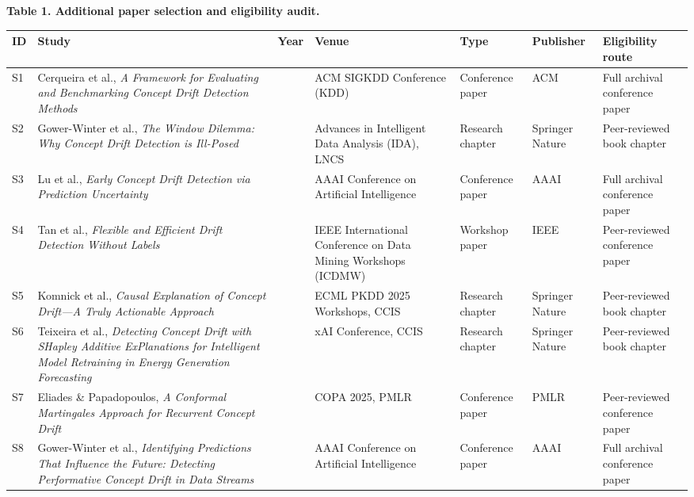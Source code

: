 \documentclass[
]{article}
\begin{document}
\textbf{Table 1. Additional paper selection and eligibility audit.}

\begin{longtable}[]{@{}
  >{\raggedright\arraybackslash}p{}
  >{\raggedright\arraybackslash}p{}
  >{\raggedright\arraybackslash}p{}
  >{\raggedright\arraybackslash}p{}
  >{\raggedright\arraybackslash}p{}
  >{\raggedright\arraybackslash}p{}
  >{\raggedright\arraybackslash}p{}@{}}
\toprule
ID & Study & Year & Venue & Type & Publisher & Eligibility route \\
\midrule
\endhead
S1 & Cerqueira et al., \emph{A Framework for Evaluating and Benchmarking
Concept Drift Detection Methods} & 2026 & ACM SIGKDD Conference (KDD) &
Conference paper & ACM & Full archival conference paper \\
S2 & Gower-Winter et al., \emph{The Window Dilemma: Why Concept Drift
Detection is Ill-Posed} & 2026 & Advances in Intelligent Data Analysis
(IDA), LNCS & Research chapter & Springer Nature & Peer-reviewed book
chapter \\
S3 & Lu et al., \emph{Early Concept Drift Detection via Prediction
Uncertainty} & 2025 & AAAI Conference on Artificial Intelligence &
Conference paper & AAAI & Full archival conference paper \\
S4 & Tan et al., \emph{Flexible and Efficient Drift Detection Without
Labels} & 2025 & IEEE International Conference on Data Mining Workshops
(ICDMW) & Workshop paper & IEEE & Peer-reviewed conference paper \\
S5 & Komnick et al., \emph{Causal Explanation of Concept Drift---A Truly
Actionable Approach} & 2026 & ECML PKDD 2025 Workshops, CCIS & Research
chapter & Springer Nature & Peer-reviewed book chapter \\
S6 & Teixeira et al., \emph{Detecting Concept Drift with SHapley
Additive ExPlanations for Intelligent Model Retraining in Energy
Generation Forecasting} & 2025 & xAI Conference, CCIS & Research chapter
& Springer Nature & Peer-reviewed book chapter \\
S7 & Eliades \& Papadopoulos, \emph{A Conformal Martingales Approach for
Recurrent Concept Drift} & 2025 & COPA 2025, PMLR & Conference paper &
PMLR & Peer-reviewed conference paper \\
S8 & Gower-Winter et al., \emph{Identifying Predictions That Influence
the Future: Detecting Performative Concept Drift in Data Streams} & 2025
& AAAI Conference on Artificial Intelligence & Conference paper & AAAI &
Full archival conference paper \\
\bottomrule
\end{longtable}
\end{document}
